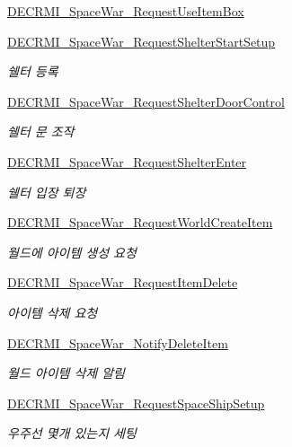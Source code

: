 \begin{DoxyCompactItemize}
\hyperlink{class_server_a5c521067e551d3c452f0d959456efa5f}{D\+E\+C\+R\+M\+I\+\_\+\+Space\+War\+\_\+\+Request\+Use\+Item\+Box}
\item 
\hyperlink{class_server_aea7095f7b70d3fd64e5bb5886e307607}{D\+E\+C\+R\+M\+I\+\_\+\+Space\+War\+\_\+\+Request\+Shelter\+Start\+Setup}
\begin{DoxyCompactList}\small\item\em 쉘터 등록 \end{DoxyCompactList}\item 
\hyperlink{class_server_aa5851fbe42b72979d7bac55fac9b5526}{D\+E\+C\+R\+M\+I\+\_\+\+Space\+War\+\_\+\+Request\+Shelter\+Door\+Control}
\begin{DoxyCompactList}\small\item\em 쉘터 문 조작 \end{DoxyCompactList}\item 
\hyperlink{class_server_a65fb1ba37047d92906443c8abe0915d1}{D\+E\+C\+R\+M\+I\+\_\+\+Space\+War\+\_\+\+Request\+Shelter\+Enter}
\begin{DoxyCompactList}\small\item\em 쉘터 입장 퇴장 \end{DoxyCompactList}\item 
\hyperlink{class_server_a8f4ad398d197ceff3c01f0bc52e783e3}{D\+E\+C\+R\+M\+I\+\_\+\+Space\+War\+\_\+\+Request\+World\+Create\+Item}
\begin{DoxyCompactList}\small\item\em 월드에 아이템 생성 요청 \end{DoxyCompactList}\item 
\hyperlink{class_server_a03e6416b5a045e91aaef9ad4e3d66e10}{D\+E\+C\+R\+M\+I\+\_\+\+Space\+War\+\_\+\+Request\+Item\+Delete}
\begin{DoxyCompactList}\small\item\em 아이템 삭제 요청 \end{DoxyCompactList}\item 
\hyperlink{class_server_a08505a5d3bef878c63f07bd5597c6782}{D\+E\+C\+R\+M\+I\+\_\+\+Space\+War\+\_\+\+Notify\+Delete\+Item}
\begin{DoxyCompactList}\small\item\em 월드 아이템 삭제 알림 \end{DoxyCompactList}\item 
\hyperlink{class_server_a66382b19e6be476d0fe49a522a374417}{D\+E\+C\+R\+M\+I\+\_\+\+Space\+War\+\_\+\+Request\+Space\+Ship\+Setup}
\begin{DoxyCompactList}\small\item\em 우주선 몇개 있는지 세팅 \end{DoxyCompactList}\item 

\end{DoxyCompactItemize}
